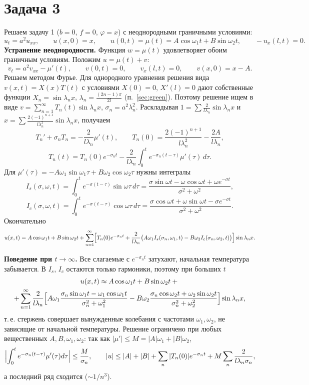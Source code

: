 \section{Задача 3}
Решаем задачу 1 ($b=0$, $f=0$, $\varphi=x$) с неоднородными граничными условиями:
\[
u_t=a^2u_{xx},\qquad u(x,0)=x,\qquad u(0,t)=\mu(t)=A\cos\omega_1t+B\sin\omega_2t,\qquad -u_x(l,t)=0 .
\]
\textbf{Устранение неоднородности.} Функция $w=\mu(t)$ удовлетворяет обоим граничным условиям. Положим $u=\mu(t)+v$:
\[
v_t=a^2v_{xx}-\mu'(t),\qquad v(0,t)=0,\qquad v_x(l,t)=0,\qquad v(x,0)=x-A .
\]
Решаем методом Фурье. Для однородного уравнения решения вида $v(x,t)=X(x)T(t)$ с условиями $X(0)=0$, $X'(l)=0$ дают собственные функции $X_n=\sin \lambda_nx$, $\lambda_n=\frac{(2n-1)\pi}{2l}$ (п.~\ref{sec:green}). Поэтому решение ищем в виде $v=\sum_{n=1}^\infty T_n(t)\sin \lambda_nx$, $\sigma_n=a^2\lambda_n^2$. Раскладывая $1=\sum\frac{2}{l\lambda_n}\sin \lambda_nx$ и $x=\sum\frac{2(-1)^{n+1}}{l\lambda_n^2}\sin \lambda_nx$, получаем
\[
T_n'+\sigma_nT_n=-\frac{2}{l\lambda_n}\mu'(t),\qquad T_n(0)=\frac{2(-1)^{n+1}}{l\lambda_n^2}-\frac{2A}{l\lambda_n},
\]
\[
T_n(t)=T_n(0)e^{-\sigma_nt}-\frac{2}{l\lambda_n}\int_0^te^{-\sigma_n(t-\tau)}\mu'(\tau)\,d\tau .
\]
Для $\mu'(\tau)=-A\omega_1\sin\omega_1\tau+B\omega_2\cos\omega_2\tau$ нужны интегралы
\[
I_s(\sigma,\omega,t)=\int_0^te^{-\sigma(t-\tau)}\sin\omega\tau\,d\tau=\frac{\sigma\sin\omega t-\omega\cos\omega t+\omega e^{-\sigma t}}{\sigma^2+\omega^2},
\]
\[
I_c(\sigma,\omega,t)=\int_0^te^{-\sigma(t-\tau)}\cos\omega\tau\,d\tau=\frac{\sigma\cos\omega t+\omega\sin\omega t-\sigma e^{-\sigma t}}{\sigma^2+\omega^2}.
\]
Окончательно
\[
u(x,t)=A\cos\omega_1t+B\sin\omega_2t+\sum_{n=1}^{\infty}\Bigl[T_n(0)e^{-\sigma_nt}+\frac{2}{l\lambda_n}\bigl(A\omega_1I_s(\sigma_n,\omega_1,t)-B\omega_2I_c(\sigma_n,\omega_2,t)\bigr)\Bigr]\sin \lambda_nx .
\]

\textbf{Поведение при $t\to\infty$.} Все слагаемые с $e^{-\sigma_nt}$ затухают, начальная температура забывается. В $I_s$, $I_c$ остаются только гармоники, поэтому при больших $t$
\begin{multline*}
u(x,t)\approx A\cos\omega_1t+B\sin\omega_2t+{}\\+\sum_{n=1}^{\infty}\frac{2}{l\lambda_n}\Bigl[A\omega_1\frac{\sigma_n\sin\omega_1t-\omega_1\cos\omega_1t}{\sigma_n^2+\omega_1^2}-B\omega_2\frac{\sigma_n\cos\omega_2t+\omega_2\sin\omega_2t}{\sigma_n^2+\omega_2^2}\Bigr]\sin\lambda_nx,
\end{multline*}
т.\,е. стержень совершает вынужденные колебания с частотами $\omega_1,\omega_2$, не зависящие от начальной температуры. Решение ограничено при любых вещественных $A,B,\omega_1,\omega_2$: так как $|\mu'|\le M=|A|\omega_1+|B|\omega_2$,
\[
\Bigl|\int_0^te^{-\sigma_n(t-\tau)}\mu'(\tau)d\tau\Bigr|\le\frac{M}{\sigma_n},\qquad
|u|\le|A|+|B|+\sum_{n}|T_n(0)|e^{-\sigma_nt}+M\sum_{n}\frac{2}{l\lambda_n\sigma_n},
\]
а последний ряд сходится ($\sim1/n^3$).

